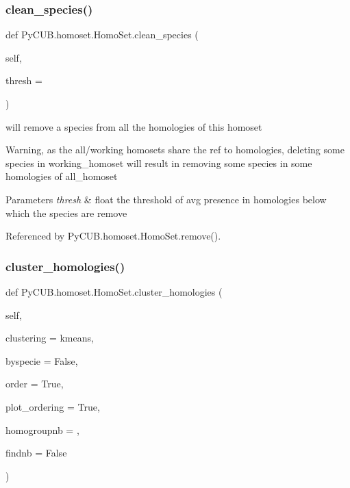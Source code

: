 \subsubsection{\texorpdfstring{clean\+\_\+species()}{clean\_species()}}
{\footnotesize\ttfamily def Py\+C\+U\+B.\+homoset.\+Homo\+Set.\+clean\+\_\+species (\begin{DoxyParamCaption}\item[{}]{self,  }\item[{}]{thresh = {} }\end{DoxyParamCaption})}



will remove a species from all the homologies of this homoset 

Warning, as the all/working homosets share the ref to homologies, deleting some species in working\+\_\+homoset will result in removing some species in some homologies of all\+\_\+homoset


\begin{DoxyParams}{Parameters}
{\em thresh} & float the threshold of avg presence in homologies below which the species are remove \\
\hline
\end{DoxyParams}


Referenced by Py\+C\+U\+B.\+homoset.\+Homo\+Set.\+remove().

\mbox{\label{class_py_c_u_b_1_1homoset_1_1_homo_set_a2d543ce742d6a4e968e14b1471319287}} 
\subsubsection{\texorpdfstring{cluster\+\_\+homologies()}{cluster\_homologies()}}
{\footnotesize\ttfamily def Py\+C\+U\+B.\+homoset.\+Homo\+Set.\+cluster\+\_\+homologies (\begin{DoxyParamCaption}\item[{}]{self,  }\item[{}]{clustering = {\ttfamily \textquotesingle{}kmeans\textquotesingle{}},  }\item[{}]{byspecie = {\ttfamily False},  }\item[{}]{order = {\ttfamily True},  }\item[{}]{plot\+\_\+ordering = {\ttfamily True},  }\item[{}]{homogroupnb = {},  }\item[{}]{findnb = {\ttfamily False} }\end{DoxyParamCaption})}



